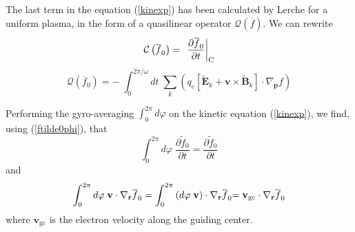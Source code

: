 The last term in the equation (\ref{kinexp}) has been calculated by Lerche
for a uniform plasma, in the form of a quasilinear operator $\mathcal{Q}
\left( \overline{f}\right) $. We can rewrite
\begin{equation}
\mathcal{C}\left( \overline{f}_{0}\right) =\;\left. \frac{\partial \overline{%
f}_{0}}{\partial t}\right| _{\text{C}}
\end{equation}
\begin{equation}
\mathcal{Q}\left( \overline{f}_{0}\right) =-\;\int_{0}^{2\pi /\omega
}dt\;\sum_{k}\left( q_{e}\left[ \widetilde{\mathbf{E}}_{k}+\mathbf{v}\times
\widetilde{\mathbf{B}}_{k}\right] \cdot \nabla _{\mathbf{p}}f\right)
\end{equation}

Performing the gyro-averaging $\int_{0}^{2\pi }d\varphi $ on the kinetic
equation (\ref{kinexp}), we find, using (\ref{ftilde0phi}), that
\begin{equation}
\int_{0}^{2\pi }d\varphi \;\frac{\partial \widetilde{f}_{0}}{\partial t}=%
\frac{\partial \widetilde{f}_{0}}{\partial t}
\end{equation}
and
\begin{equation}
\int_{0}^{2\pi }d\varphi \;\mathbf{v}\cdot \nabla _{\mathbf{r}}\overline{f}
_{0}=\int_{0}^{2\pi }\left( d\varphi \;\mathbf{v}\right) \cdot \nabla _{%
\mathbf{r}}\overline{f}_{0}\mathbf{=v}_{\text{gc}}\cdot \nabla _{\mathbf{r}}%
\overline{f}_{0}
\end{equation}
where $\mathbf{v}_{\text{gc}}$ is the electron velocity along the guiding
center.

